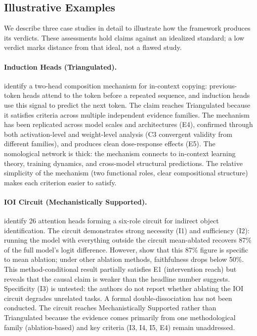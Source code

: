 \documentclass{article}
\begin{document}
\subsection{Illustrative Examples}

We describe three case studies in detail to illustrate how the framework produces its verdicts. These assessments hold claims against an idealized standard; a low verdict marks distance from that ideal, not a flawed study.

\paragraph{Induction Heads (Triangulated).} \citet{olsson2022context} identify a two-head composition mechanism for in-context copying: previous-token heads attend to the token before a repeated sequence, and induction heads use this signal to predict the next token. The claim reaches Triangulated because it satisfies criteria across multiple independent evidence families. The mechanism has been replicated across model scales and architectures (E4), confirmed through both activation-level and weight-level analysis (C3 convergent validity from different families), and produces clean dose-response effects (E5). The nomological network is thick: the mechanism connects to in-context learning theory, training dynamics, and cross-model structural predictions. The relative simplicity of the mechanism (two functional roles, clear compositional structure) makes each criterion easier to satisfy.

\paragraph{IOI Circuit (Mechanistically Supported).} \citet{wang2023interpretability} identify 26 attention heads forming a six-role circuit for indirect object identification. The circuit demonstrates strong necessity (I1) and sufficiency (I2): running the model with everything outside the circuit mean-ablated recovers 87\% of the full model's logit difference. However, \citet{miller2024transformer} show that this 87\% figure is specific to mean ablation; under other ablation methods, faithfulness drops below 50\%. This method-conditional result partially satisfies E1 (intervention reach) but reveals that the causal claim is weaker than the headline number suggests. Specificity (I3) is untested: the authors do not report whether ablating the IOI circuit degrades unrelated tasks. A formal double-dissociation has not been conducted. The circuit reaches Mechanistically Supported rather than Triangulated because the evidence comes primarily from one methodological family (ablation-based) and key criteria (I3, I4, I5, E4) remain unaddressed.
\end{document}
